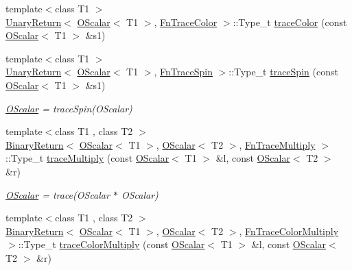 \begin{DoxyCompactItemize}
\item 
{\footnotesize template$<$class T1 $>$ }\\\mbox{\hyperlink{structENSEM_1_1UnaryReturn}{Unary\+Return}}$<$ \mbox{\hyperlink{classENSEM_1_1OScalar}{O\+Scalar}}$<$ T1 $>$, \mbox{\hyperlink{structENSEM_1_1FnTraceColor}{Fn\+Trace\+Color}} $>$\+::Type\+\_\+t \mbox{\hyperlink{group__obsscalar_ga6c49507babe850f36f0765318257dc08}{trace\+Color}} (const \mbox{\hyperlink{classENSEM_1_1OScalar}{O\+Scalar}}$<$ T1 $>$ \&s1)
\item 
{\footnotesize template$<$class T1 $>$ }\\\mbox{\hyperlink{structENSEM_1_1UnaryReturn}{Unary\+Return}}$<$ \mbox{\hyperlink{classENSEM_1_1OScalar}{O\+Scalar}}$<$ T1 $>$, \mbox{\hyperlink{structENSEM_1_1FnTraceSpin}{Fn\+Trace\+Spin}} $>$\+::Type\+\_\+t \mbox{\hyperlink{group__obsscalar_gaec323bb3e795f6f48bd41e629e4c38ab}{trace\+Spin}} (const \mbox{\hyperlink{classENSEM_1_1OScalar}{O\+Scalar}}$<$ T1 $>$ \&s1)
\begin{DoxyCompactList}\small\item\em \mbox{\hyperlink{classENSEM_1_1OScalar}{O\+Scalar}} = trace\+Spin(\+O\+Scalar) \end{DoxyCompactList}\item 
{\footnotesize template$<$class T1 , class T2 $>$ }\\\mbox{\hyperlink{structENSEM_1_1BinaryReturn}{Binary\+Return}}$<$ \mbox{\hyperlink{classENSEM_1_1OScalar}{O\+Scalar}}$<$ T1 $>$, \mbox{\hyperlink{classENSEM_1_1OScalar}{O\+Scalar}}$<$ T2 $>$, \mbox{\hyperlink{structENSEM_1_1FnTraceMultiply}{Fn\+Trace\+Multiply}} $>$\+::Type\+\_\+t \mbox{\hyperlink{group__obsscalar_ga5b8fcde5132f05c1632c08d0e22c04a7}{trace\+Multiply}} (const \mbox{\hyperlink{classENSEM_1_1OScalar}{O\+Scalar}}$<$ T1 $>$ \&l, const \mbox{\hyperlink{classENSEM_1_1OScalar}{O\+Scalar}}$<$ T2 $>$ \&r)
\begin{DoxyCompactList}\small\item\em \mbox{\hyperlink{classENSEM_1_1OScalar}{O\+Scalar}} = trace(\+O\+Scalar $\ast$ O\+Scalar) \end{DoxyCompactList}\item 
{\footnotesize template$<$class T1 , class T2 $>$ }\\\mbox{\hyperlink{structENSEM_1_1BinaryReturn}{Binary\+Return}}$<$ \mbox{\hyperlink{classENSEM_1_1OScalar}{O\+Scalar}}$<$ T1 $>$, \mbox{\hyperlink{classENSEM_1_1OScalar}{O\+Scalar}}$<$ T2 $>$, \mbox{\hyperlink{structENSEM_1_1FnTraceColorMultiply}{Fn\+Trace\+Color\+Multiply}} $>$\+::Type\+\_\+t \mbox{\hyperlink{group__obsscalar_gabe14ff90818892f233905fa6dad8eb49}{trace\+Color\+Multiply}} (const \mbox{\hyperlink{classENSEM_1_1OScalar}{O\+Scalar}}$<$ T1 $>$ \&l, const \mbox{\hyperlink{classENSEM_1_1OScalar}{O\+Scalar}}$<$ T2 $>$ \&r)

\end{DoxyCompactItemize}

